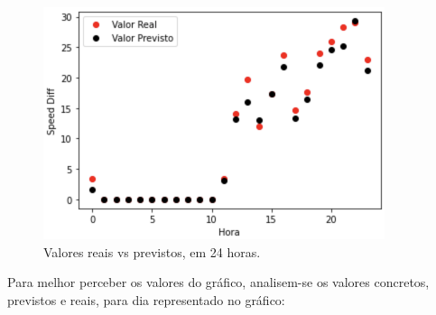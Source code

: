 \documentclass[a4paper, 12pt]{article}
\begin{document}
\begin{figure}[H]
	\centering
	\includegraphics[width=10cm]{resultados/real_prev_4.png}
	\caption{Valores reais vs previstos, em 24 horas.}
\end{figure}

Para melhor perceber os valores do gráfico, analisem-se os valores concretos, previstos e reais, para dia representado no gráfico:
\end{document}
